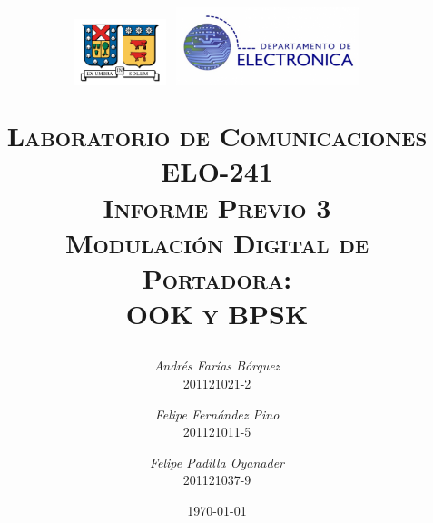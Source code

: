 
\begin{titlepage}
\title{\begin{minipage}{\textwidth}
\vspace{-9em}
\includegraphics[width=0.2\textwidth]{img/logo_utfsm}
\hfill
\includegraphics[width=0.4\textwidth]{img/logoelo2}
\vspace{1em}
\end{minipage}
\HRule \vspace{1em} \textsc{Laboratorio de Comunicaciones\\ELO-241\\ \Large \vspace{1em} \textbf{Informe Previo 3}\\Modulación Digital de Portadora:\\OOK y BPSK} \HRule \vspace{3em}}
\author{\textsl{Andrés Farías Bórquez}\\201121021-2 \and \textsl{Felipe Fernández Pino}\\201121011-5 \and \textsl{Felipe Padilla Oyanader}\\201121037-9}
\date{\vfill \today}
\end{titlepage}

\pagestyle{fancy}
